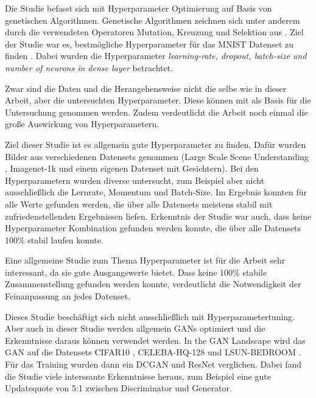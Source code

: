 Die Studie befasst sich mit Hyperparameter Optimierung auf Basis von genetischen Algorithmen.
Genetische Algorithmen zeichnen sich unter anderem durch die verwendeten Operatoren Mutation, Kreuzung und Selektion aus \cite{genetic-algorithms}.
Ziel der Studie war es, bestmögliche Hyperparameter für das MNIST Datenset zu finden \cite{dataset:mnist}.
Dabei wurden die Hyperparameter \textit{learning-rate, dropout, batch-size und number of neurons in dense layer} betrachtet.
\newline

Zwar sind die Daten und die Herangehensweise nicht die selbe wie in dieser Arbeit, aber die untersuchten Hyperparameter.
Diese können mit als Basis für die Untersuchung genommen werden.
Zudem verdeutlicht die Arbeit noch einmal die große Auswirkung von Hyperparametern.

Ziel dieser Studie ist es allgemein gute Hyperparameter zu finden.
Dafür wurden Bilder aus verschiedenen Datensets genommen (Large Scale Scene Understanding \cite{dataset:lsun}, Imagenet-1k \cite{dataset:image-net} und einem eigenen Datenset mit Gesichtern).
Bei den Hyperparametern wurden diverse untersucht, zum Beispiel aber nicht ausschließlich die Lernrate, Momentum und Batch-Size.
Im Ergebnis konnten für alle Werte gefunden werden, die über alle Datensets meistens stabil mit zufriedenstellenden Ergebnissen liefen.
Erkenntnis der Studie war auch, dass keine Hyperparameter Kombination gefunden werden konnte, die über alle Datensets 100\% stabil laufen konnte.
\newline

Eine allgemeine Studie zum Thema Hyperparameter ist für die Arbeit sehr interessant, da sie gute Ausgangswerte bietet.
Dass keine 100\% stabile Zusammenstellung gefunden werden konnte, verdeutlicht die Notwendigkeit der Feinanpassung an jedes Datenset.


Dieses Studie beschäftigt sich nicht ausschließlich mit Hyperparametertuning.
Aber auch in dieser Studie werden allgemein GANs optimiert und die Erkenntnisse daraus können verwendet werden.
In the GAN Landscape wird das GAN auf die Datensets CIFAR10 \cite{dataset:cifar10}, CELEBA-HQ-128 und LSUN-BEDROOM \cite{dataset:lsun}.
Für das Training wurden dann ein DCGAN und ResNet verglichen.
Dabei fand die Studie viele interssante Erkenntnisse heraus, zum Beispiel eine gute Updatequote von 5:1 zwischen Discriminator und Generator.
\newline

